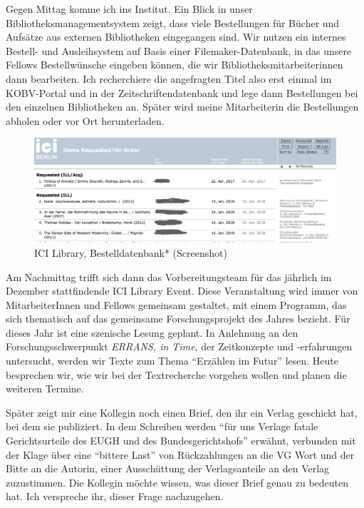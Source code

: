 \documentclass[a4paper,
fontsize=11pt,
oneside,
numbers=noperiodatend,
parskip=half-,
bibliography=totoc,
final
]{scrartcl}
\begin{document}
Gegen Mittag komme ich ins Institut. Ein Blick in unser
Bibliotheksmanagementsystem zeigt, dass viele Bestellungen für Bücher
und Aufsätze aus externen Bibliotheken eingegangen sind. Wir nutzen ein
internes Bestell- und Ausleihsystem auf Basis einer Filemaker-Datenbank,
in das unsere Fellows Bestellwünsche eingeben können, die wir
Bibliotheksmitarbeiterinnen dann bearbeiten. Ich recherchiere die
angefragten Titel also erst einmal im KOBV-Portal und in der
Zeitschriftendatenbank und lege dann Bestellungen bei den einzelnen
Bibliotheken an. Später wird meine Mitarbeiterin die Bestellungen
abholen oder vor Ort herunterladen.

\begin{figure}
\centering
\includegraphics{img/Haas_2.jpg}
\caption{ICI Library, Bestelldatenbank* (Screenshot)}
\end{figure}

Am Nachmittag trifft sich dann das Vorbereitungsteam für das jährlich im
Dezember stattfindende ICI Library Event. Diese Veranstaltung wird immer
von MitarbeiterInnen und Fellows gemeinsam gestaltet, mit einem
Programm, das sich thematisch auf das gemeinsame Forschungsprojekt des
Jahres bezieht. Für dieses Jahr ist eine szenische Lesung geplant. In
Anlehnung an den Forschungsschwerpunkt \emph{ERRANS, in Time}, der
Zeitkonzepte und -erfahrungen untersucht, werden wir Texte zum Thema
\enquote{Erzählen im Futur} lesen. Heute besprechen wir, wie wir bei der
Textrecherche vorgehen wollen und planen die weiteren Termine.

Später zeigt mir eine Kollegin noch einen Brief, den ihr ein Verlag
geschickt hat, bei dem sie publiziert. In dem Schreiben werden
\enquote{für uns Verlage fatale Gerichtsurteile des EUGH und des
Bundesgerichtshofs} erwähnt, verbunden mit der Klage über eine
\enquote{bittere Last} von Rückzahlungen an die VG Wort und der Bitte an
die Autorin, einer Ausschüttung der Verlagsanteile an den Verlag
zuzustimmen. Die Kollegin möchte wissen, was dieser Brief genau zu
bedeuten hat. Ich verspreche ihr, dieser Frage nachzugehen.
\end{document}
